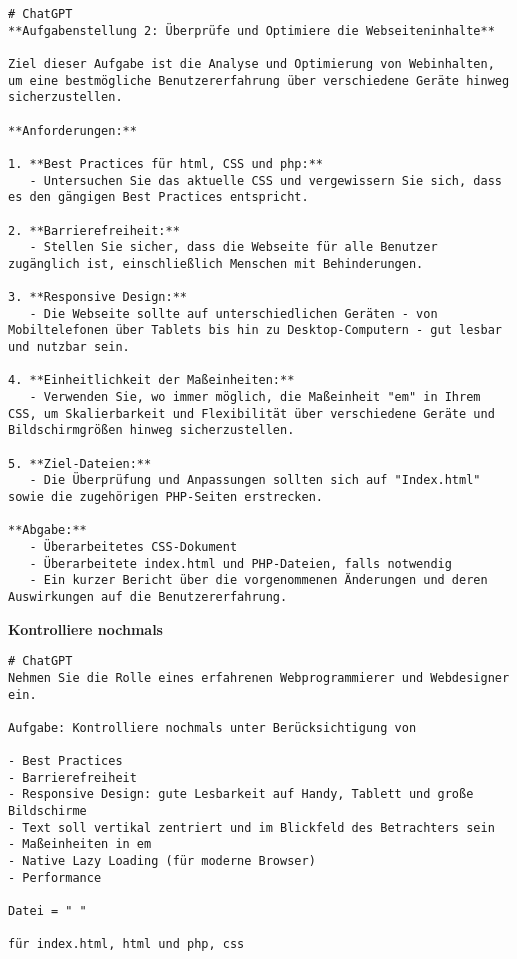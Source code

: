 \documentclass[12pt,a4paper]{scrartcl}
\begin{document}
\begin{lstlisting}
# ChatGPT
**Aufgabenstellung 2: Überprüfe und Optimiere die Webseiteninhalte**

Ziel dieser Aufgabe ist die Analyse und Optimierung von Webinhalten, um eine bestmögliche Benutzererfahrung über verschiedene Geräte hinweg sicherzustellen. 

**Anforderungen:**

1. **Best Practices für html, CSS und php:** 
   - Untersuchen Sie das aktuelle CSS und vergewissern Sie sich, dass es den gängigen Best Practices entspricht.
   
2. **Barrierefreiheit:** 
   - Stellen Sie sicher, dass die Webseite für alle Benutzer zugänglich ist, einschließlich Menschen mit Behinderungen.
   
3. **Responsive Design:** 
   - Die Webseite sollte auf unterschiedlichen Geräten - von Mobiltelefonen über Tablets bis hin zu Desktop-Computern - gut lesbar und nutzbar sein.
   
4. **Einheitlichkeit der Maßeinheiten:** 
   - Verwenden Sie, wo immer möglich, die Maßeinheit "em" in Ihrem CSS, um Skalierbarkeit und Flexibilität über verschiedene Geräte und Bildschirmgrößen hinweg sicherzustellen.
   
5. **Ziel-Dateien:** 
   - Die Überprüfung und Anpassungen sollten sich auf "Index.html" sowie die zugehörigen PHP-Seiten erstrecken.

**Abgabe:** 
   - Überarbeitetes CSS-Dokument
   - Überarbeitete index.html und PHP-Dateien, falls notwendig
   - Ein kurzer Bericht über die vorgenommenen Änderungen und deren Auswirkungen auf die Benutzererfahrung.
\end{lstlisting}

\textbf{Kontrolliere nochmals}

\begin{lstlisting}
# ChatGPT
Nehmen Sie die Rolle eines erfahrenen Webprogrammierer und Webdesigner ein.

Aufgabe: Kontrolliere nochmals unter Berücksichtigung von

- Best Practices  
- Barrierefreiheit
- Responsive Design: gute Lesbarkeit auf Handy, Tablett und große Bildschirme
- Text soll vertikal zentriert und im Blickfeld des Betrachters sein
- Maßeinheiten in em
- Native Lazy Loading (für moderne Browser)
- Performance

Datei = " "

für index.html, html und php, css
\end{lstlisting}
\end{document}
